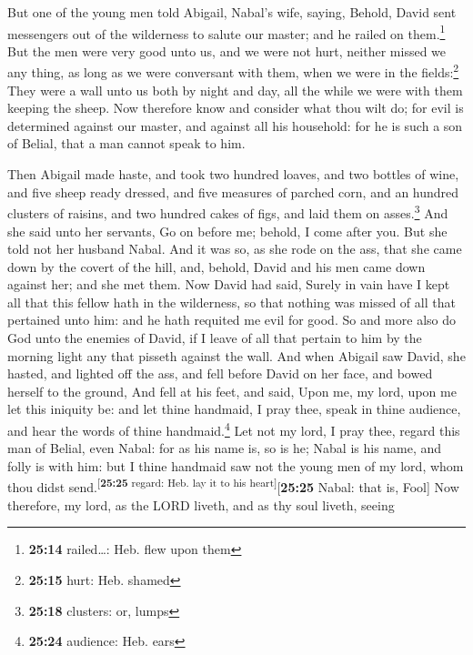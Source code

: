  But one of the young men told Abigail, Nabal's wife,
saying, Behold, David sent messengers out of the wilderness to salute
our master; and he railed on them.\footnote{\textbf{25:14} railed\ldots:
  Heb. flew upon them}  But the men were very good unto
us, and we were not hurt, neither missed we any thing, as long as we
were conversant with them, when we were in the fields:\footnote{\textbf{25:15}
  hurt: Heb. shamed}  They were a wall unto us both by
night and day, all the while we were with them keeping the sheep.
 Now therefore know and consider what thou wilt do; for
evil is determined against our master, and against all his household:
for he is such a son of Belial, that a man cannot speak to him.

 Then Abigail made haste, and took two hundred loaves,
and two bottles of wine, and five sheep ready dressed, and five measures
of parched corn, and an hundred clusters of raisins, and two hundred
cakes of figs, and laid them on asses.\footnote{\textbf{25:18} clusters:
  or, lumps}  And she said unto her servants, Go on
before me; behold, I come after you. But she told not her husband Nabal.
 And it was so, as she rode on the ass, that she came
down by the covert of the hill, and, behold, David and his men came down
against her; and she met them.  Now David had said,
Surely in vain have I kept all that this fellow hath in the wilderness,
so that nothing was missed of all that pertained unto him: and he hath
requited me evil for good.  So and more also do God unto
the enemies of David, if I leave of all that pertain to him by the
morning light any that pisseth against the wall.  And
when Abigail saw David, she hasted, and lighted off the ass, and fell
before David on her face, and bowed herself to the ground,
 And fell at his feet, and said, Upon me, my lord, upon
me let this iniquity be: and let thine handmaid, I pray thee, speak in
thine audience, and hear the words of thine handmaid.\footnote{\textbf{25:24}
  audience: Heb. ears}  Let not my lord, I pray thee,
regard this man of Belial, even Nabal: for as his name is, so is he;
Nabal is his name, and folly is with him: but I thine handmaid saw not
the young men of my lord, whom thou didst
send.\textsuperscript{{[}\textbf{25:25} regard: Heb. lay it to his
heart{]}}{[}\textbf{25:25} Nabal: that is, Fool{]}  Now
therefore, my lord, as the LORD liveth, and as thy soul liveth, seeing
